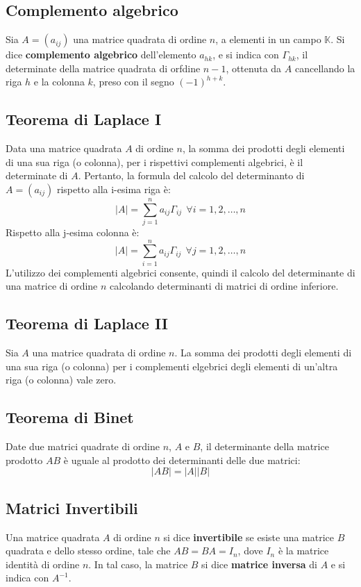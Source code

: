 \documentclass{article}
\begin{document}
\subsection{Complemento algebrico}
Sia $A= (a_{ij})$ una matrice quadrata di ordine $n$, a elementi in un campo
$\mathbb{K}$. Si dice \textbf{complemento algebrico} dell'elemento $a_{hk}$, e
si indica con $\Gamma_{hk}$, il determinate della matrice quadrata di orfdine
$n-1$, ottenuta da $A$ cancellando la riga $h$ e la colonna $k$, preso con il
segno $ (-1)^{h+k} $.

\subsection{Teorema di Laplace I}
Data una matrice quadrata $A$ di ordine $n$, la somma dei prodotti degli
elementi di una sua riga (o colonna), per i rispettivi complementi algebrici, è
il determinate di $A$. Pertanto, la formula del calcolo del determinanto di $A=
    (a_{ij})$ rispetto alla i-esima riga è:
\[
    |A| = \sum_{j=1}^n a_{ij}\Gamma_{ij} \ \ \forall i = 1, 2, \ldots, n
\]
Rispetto alla j-esima colonna è:
\[
    |A| = \sum_{i=1}^n a_{ij}\Gamma_{ij} \ \ \forall j = 1, 2, \ldots, n
\]
L'utilizzo dei complementi algebrici consente, quindi il calcolo del
determinante di una matrice di ordine $n$ calcolando determinanti di matrici di
ordine inferiore.

\subsection{Teorema di Laplace II}
Sia $A$ una matrice quadrata di ordine $n$. La somma dei prodotti degli
elementi di una sua riga (o colonna) per i complementi elgebrici degli elementi
di un'altra riga (o colonna) vale zero.

\subsection{Teorema di Binet}
Date due matrici quadrate di ordine $n$, $A$ e $B$, il determinante della
matrice prodotto $AB$ è uguale al prodotto dei determinanti delle due matrici:
\[
    |AB| = |A||B|
\]

\subsection{Matrici Invertibili}
Una matrice quadrata $A$ di ordine $n$ si dice \textbf{invertibile} se esiste
una matrice $B$ quadrata e dello stesso ordine, tale che $AB = BA = I_n$, dove
$I_n$ è la matrice identità di ordine $n$. In tal caso, la matrice $B$ si dice
\textbf{matrice inversa} di $A$ e si indica con $A^{-1}$.
\end{document}
